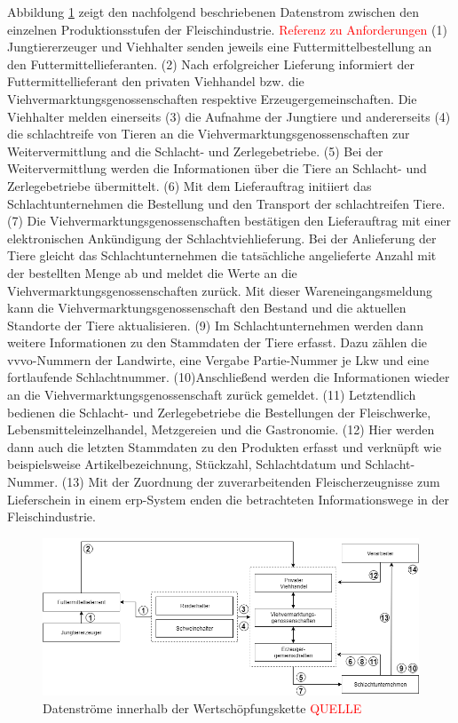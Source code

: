 Abbildung \ref{fig:data-stream-meat-industry} zeigt den nachfolgend beschriebenen Datenstrom zwischen den einzelnen Produktionsstufen der Fleischindustrie. \textcolor{red}{Referenz zu Anforderungen} (1) Jungtiererzeuger und Viehhalter senden jeweils eine Futtermittelbestellung an den Futtermittellieferanten. (2) Nach erfolgreicher Lieferung informiert der Futtermittellieferant den privaten Viehhandel bzw. die Viehvermarktungsgenossenschaften respektive Erzeugergemeinschaften. Die Viehhalter melden einerseits (3) die Aufnahme der Jungtiere und andererseits (4) die schlachtreife von Tieren an die Viehvermarktungsgenossenschaften zur Weitervermittlung and die Schlacht- und Zerlegebetriebe. (5) Bei der Weitervermittlung werden die Informationen über die Tiere an Schlacht- und Zerlegebetriebe übermittelt. (6) Mit dem Lieferauftrag initiiert das Schlachtunternehmen die Bestellung und den Transport der schlachtreifen Tiere. (7) Die Viehvermarktungsgenossenschaften bestätigen den Lieferauftrag mit einer elektronischen Ankündigung der Schlachtviehlieferung. Bei der Anlieferung der Tiere gleicht das Schlachtunternehmen die tatsächliche angelieferte Anzahl mit der bestellten Menge ab und meldet die Werte an die Viehvermarktungsgenossenschaften zurück. Mit dieser Wareneingangsmeldung kann die Viehvermarktungsgenossenschaft den Bestand und die aktuellen Standorte der Tiere aktualisieren. (9) Im Schlachtunternehmen werden dann weitere Informationen zu den Stammdaten der Tiere erfasst. Dazu zählen die \ac{vvvo}-Nummern der Landwirte, eine Vergabe Partie-Nummer je Lkw und eine fortlaufende Schlachtnummer. (10)Anschließend werden die Informationen wieder an die Viehvermarktungsgenossenschaft zurück gemeldet. (11) Letztendlich bedienen die Schlacht- und Zerlegebetriebe die Bestellungen der Fleischwerke, Lebensmitteleinzelhandel, Metzgereien und die Gastronomie. (12) Hier werden dann auch die letzten Stammdaten zu den Produkten erfasst und verknüpft wie beispielsweise Artikelbezeichnung, Stückzahl, Schlachtdatum und Schlacht-Nummer. (13) Mit der Zuordnung der zuverarbeitenden Fleischerzeugnisse zum Lieferschein in einem \ac{erp}-System enden die betrachteten Informationswege in der Fleischindustrie.

\begin{figure}[H]
	\centering
	\includegraphics[width=1\linewidth]{pictures/data-stream-meat-industry-numbered}
	\caption[Datenströme innerhalb der Wertschöpfungskette]{Datenströme innerhalb der Wertschöpfungskette \textcolor{red}{QUELLE}}
	\label{fig:data-stream-meat-industry}
\end{figure}

